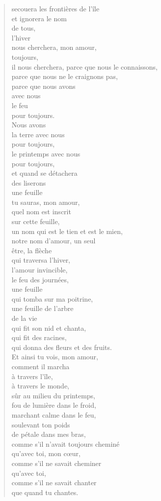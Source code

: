 \documentclass[11pt,a4paper]{book}
\begin{document}
\begin{verse}
secouera les frontières de l'île \\
et ignorera le nom \\
de tous, \\
l'hiver \\
nous cherchera, mon amour, \\
toujours, \\
il nous cherchera, parce que nous le connaissons, \\
parce que nous ne le craignons pas, \\
parce que nous avons \\
avec nous \\
le feu \\
pour toujours. \\
Nous avons \\
la terre avec nous \\
pour toujours, \\
le printemps avec nous \\
pour toujours, \\
et quand se détachera \\
des liserons \\
une feuille \\
tu sauras, mon amour, \\
quel nom est inscrit \\
sur cette feuille, \\
un nom qui est le tien et est le mien, \\
notre nom d'amour, un seul \\
être, la flèche \\
qui traversa l'hiver, \\
l'amour invincible, \\
le feu des journées, \\
une feuille \\
qui tomba sur ma poitrine, \\
une feuille de l'arbre \\
de la vie \\
qui fit son nid et chanta, \\
qui fit des racines, \\
qui donna des fleurs et des fruits. \\
Et ainsi tu vois, mon amour, \\
comment il marcha \\
à travers l'île, \\
à travers le monde, \\
sûr au milieu du printemps, \\
fou de lumière dans le froid, \\
marchant calme dans le feu, \\
soulevant ton poids \\
de pétale dans mes bras, \\
comme s'il n'avait toujours cheminé \\
qu'avec toi, mon c{\oe}ur, \\
comme s'il ne savait cheminer \\
qu'avec toi, \\
comme s'il ne savait chanter \\
que quand tu chantes.
\end{verse}
\end{document}
